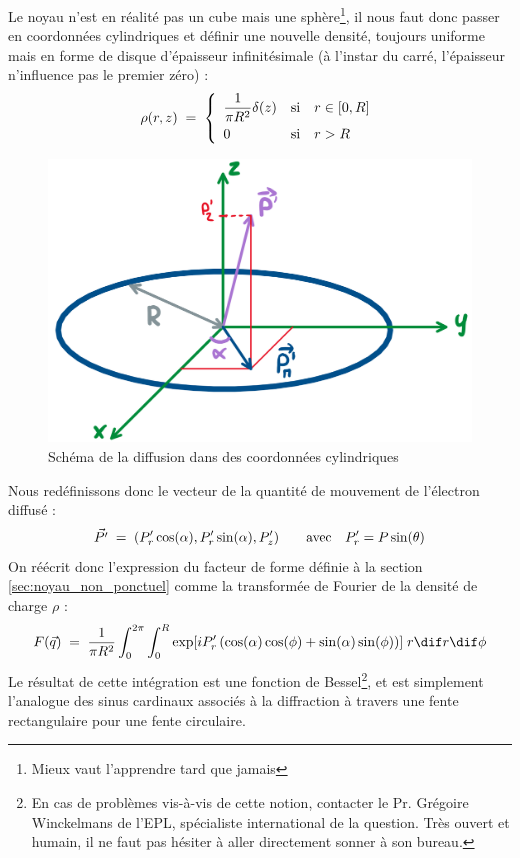 Le noyau n'est en réalité pas un cube mais une sphère\footnote{Mieux vaut l'apprendre tard que jamais}, il nous faut donc passer en coordonnées cylindriques et définir une nouvelle densité, toujours uniforme mais en forme de disque d'épaisseur infinitésimale (à l'instar du carré, l'épaisseur n'influence pas le premier zéro) :
    \[
        \rho(r,z) \; = \;
        \left\{
        \begin{array}{lll}
            \dfrac{1}{\pi R^2} \delta(z) &  \text{si} & r \in [0,R]\\[7pt]
            0 & \text{si} & r > R 
        \end{array}
        \right.
    \]
     \begin{figure}[H]
    \centering
    \includegraphics[scale=.4]{Images4/noyau_disque.png}
    \caption{Schéma de la diffusion dans des coordonnées cylindriques}
    \label{fig:Schéma coordonnées sphériques}
\end{figure}
Nous redéfinissons donc le vecteur de la quantité de mouvement de l'électron diffusé :
\[
    \vec{P'} \; = \; (P'_r \cos(\alpha), P'_r \sin(\alpha), P'_z)
    \qquad \text{avec} \quad P'_r = P \sin(\theta)
\]
On réécrit donc l'expression du facteur de forme définie à la section \ref{sec:noyau_non_ponctuel} comme la transformée de Fourier de la densité de charge $\rho$ :
\[
    F(\vec{q}) \eq \dfrac{1}{\pi R^2}\int_0^{2\pi} \int_0^R \exp[ iP'_r \left(\cos(\alpha)\cos(\phi) + \sin(\alpha)\sin(\phi) \right) ] \; r \dif r \dif\phi
\]
Le résultat de cette intégration est une fonction de Bessel\footnote{En cas de problèmes vis-à-vis de cette notion, contacter le Pr. Grégoire Winckelmans de l'EPL, spécialiste international de la question. Très ouvert et humain, il ne faut pas hésiter à aller directement sonner à son bureau.}, et est simplement l'analogue des sinus cardinaux associés à la diffraction à travers une fente rectangulaire pour une fente circulaire.

